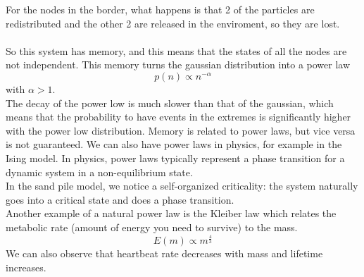\begin{center}
\end{center}
For the nodes in the border, what happens is that 2 of the particles are redistributed and the other 2 are released in the enviroment, so they are lost. \\ \\
So this system has memory, and this means that the states of all the nodes are not independent. This memory turns the gaussian distribution into a power law
$$
	p(n) \propto n^{-\alpha}
$$
with $\alpha > 1$. \\
The decay of the power low is much slower than that of the gaussian, which means that the probability to have events in the extremes is significantly higher with the power low distribution.
Memory is related to power laws, but vice versa is not guaranteed.
We can also have power laws in physics, for example in the Ising model.
In physics, power laws typically represent a phase transition for a dynamic system in a non-equilibrium state. \\
In the sand pile model, we notice a self-organized criticality: the system naturally goes into a critical state and does a phase transition. \\
Another example of a natural power law is the Kleiber law which relates the metabolic rate (amount of energy you need to survive) to the mass.
\begin{equation}
	E(m) \propto m^{\frac{4}{3}}
\end{equation}
We can also observe that heartbeat rate decreases with mass and lifetime increases.
